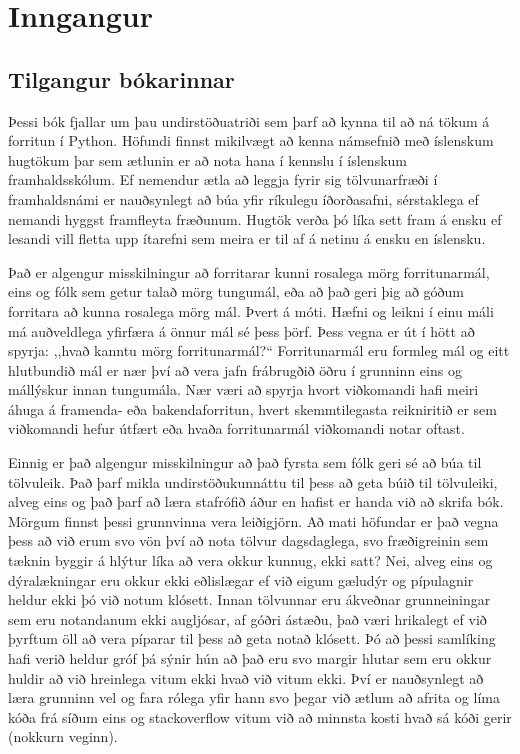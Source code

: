 


\chapter{Inngangur}

\section{Tilgangur bókarinnar}

Þessi bók fjallar um þau undirstöðuatriði sem þarf að kynna til að ná tökum á forritun í Python. 
Höfundi finnst mikilvægt að kenna námsefnið með íslenskum hugtökum þar sem ætlunin er að nota hana í kennslu í íslenskum framhaldsskólum. 
Ef nemendur ætla að leggja fyrir sig tölvunarfræði í framhaldsnámi er nauðsynlegt að búa yfir ríkulegu íðorðasafni, sérstaklega ef nemandi hyggst framfleyta fræðunum. 
Hugtök verða þó líka sett fram á ensku ef lesandi vill fletta upp ítarefni sem meira er til af á netinu á ensku en íslensku.

Það er algengur misskilningur að forritarar kunni rosalega mörg forritunarmál, eins og fólk sem getur talað mörg tungumál, eða að það geri þig að góðum forritara að kunna rosalega mörg mál.
Þvert á móti.
Hæfni og leikni í einu máli má auðveldlega yfirfæra á önnur mál sé þess þörf.
Þess vegna er út í hött að spyrja: ,,hvað kanntu mörg forritunarmál?“
Forritunarmál eru formleg mál og eitt hlutbundið mál er nær því að vera jafn frábrugðið öðru í grunninn eins og mállýskur innan tungumála.
Nær væri að spyrja hvort viðkomandi hafi meiri áhuga á framenda- eða bakendaforritun, hvert skemmtilegasta reikniritið er sem viðkomandi hefur útfært eða hvaða forritunarmál viðkomandi notar oftast.

Einnig er það algengur misskilningur að það fyrsta sem fólk geri sé að búa til tölvuleik.
Það þarf mikla undirstöðukunnáttu til þess að geta búið til tölvuleiki, alveg eins og það þarf að læra stafrófið áður en hafist er handa við að skrifa bók.
Mörgum finnst þessi grunnvinna vera leiðigjörn.
Að mati höfundar er það vegna þess að við erum svo vön því að nota tölvur dagsdaglega, svo fræðigreinin sem tæknin byggir á hlýtur líka að vera okkur kunnug, ekki satt?
Nei, alveg eins og dýralækningar eru okkur ekki eðlislægar ef við eigum gæludýr og pípulagnir heldur ekki þó við notum klósett.
Innan tölvunnar eru ákveðnar grunneiningar sem eru notandanum ekki augljósar, af góðri ástæðu, það væri hrikalegt ef við þyrftum öll að vera píparar til þess að geta notað klósett.
Þó að þessi samlíking hafi verið heldur gróf þá sýnir hún að það eru svo margir hlutar sem eru okkur huldir að við hreinlega vitum ekki hvað við vitum ekki.
Því er nauðsynlegt að læra grunninn vel og fara rólega yfir hann svo þegar við ætlum að afrita og líma kóða frá síðum eins og stackoverflow vitum við að minnsta kosti hvað sá kóði gerir (nokkurn veginn).

